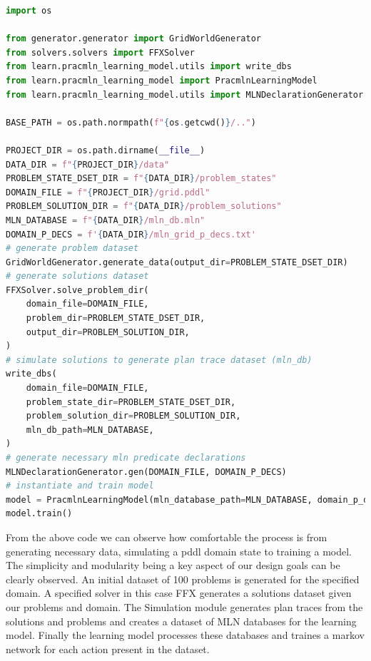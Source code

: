 \begin{lstlisting}[language=Python]
import os

from generator.generator import GridWorldGenerator
from solvers.solvers import FFXSolver
from learn.pracmln_learning_model.utils import write_dbs
from learn.pracmln_learning_model import PracmlnLearningModel
from learn.pracmln_learning_model.utils import MLNDeclarationGenerator

BASE_PATH = os.path.normpath(f"{os.getcwd()}/..")

PROJECT_DIR = os.path.dirname(__file__)
DATA_DIR = f"{PROJECT_DIR}/data"
PROBLEM_STATE_DSET_DIR = f"{DATA_DIR}/problem_states"
DOMAIN_FILE = f"{PROJECT_DIR}/grid.pddl"
PROBLEM_SOLUTION_DIR = f"{DATA_DIR}/problem_solutions"
MLN_DATABASE = f"{DATA_DIR}/mln_db.mln"
DOMAIN_P_DECS = f'{DATA_DIR}/mln_grid_p_decs.txt'
# generate problem dataset
GridWorldGenerator.generate_data(output_dir=PROBLEM_STATE_DSET_DIR)
# generate solutions dataset
FFXSolver.solve_problem_dir(
    domain_file=DOMAIN_FILE,
    problem_dir=PROBLEM_STATE_DSET_DIR,
    output_dir=PROBLEM_SOLUTION_DIR,
)
# simulate solutions to generate plan trace dataset (mln_db)
write_dbs(
    domain_file=DOMAIN_FILE,
    problem_state_dir=PROBLEM_STATE_DSET_DIR,
    problem_solution_dir=PROBLEM_SOLUTION_DIR,
    mln_db_path=MLN_DATABASE,
)
# generate necessary mln predicate declarations
MLNDeclarationGenerator.gen(DOMAIN_FILE, DOMAIN_P_DECS)
# instantiate and train model
model = PracmlnLearningModel(mln_database_path=MLN_DATABASE, domain_p_decs_path=DOMAIN_P_DECS)
model.train()
\end{lstlisting}\label{example-project}

From the above code we can observe how comfortable the process is from generating necessary data, simulating a pddl domain state to training a model.
The simplicity and modularity being a key aspect of our design goals can be clearly observed.
An initial dataset of 100 problems is generated for the specified domain.
A specified solver in this case FFX generates a solutions dataset given our problems and domain.
The Simulation module generates plan traces from the solutions and problems and creates a dataset of MLN databases for the learning model.
Finally the learning model processes these databases and traines a markov network for each action present in the dataset.








